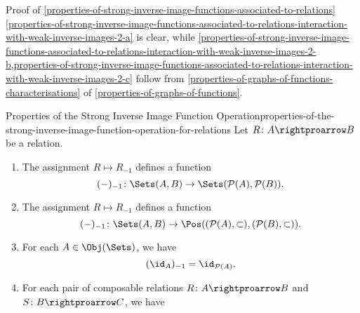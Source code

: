\begin{Proof}{Proof of \cref{properties-of-strong-inverse-image-functions-associated-to-relations}}
    \cref{properties-of-strong-inverse-image-functions-associated-to-relations-interaction-with-weak-inverse-images-2-a} is clear, while \cref{properties-of-strong-inverse-image-functions-associated-to-relations-interaction-with-weak-inverse-images-2-b,properties-of-strong-inverse-image-functions-associated-to-relations-interaction-with-weak-inverse-images-2-c} follow from \cref{properties-of-graphs-of-functions-characterisations} of \cref{properties-of-graphs-of-functions}.
\end{Proof}
\begin{proposition}{Properties of the Strong Inverse Image Function Operation}{properties-of-the-strong-inverse-image-function-operation-for-relations}%
    Let $R\colon A\rightproarrow B$ be a relation.
    \begin{enumerate}
        \item\label{properties-of-the-strong-inverse-image-function-operation-for-relations-functionality-1}The assignment $R\mapsto R_{-1}$ defines a function
            \[
                (-)_{-1}%
                \colon%
                \Sets(A,B)
                \to%
                \Sets(\mathcal{P}(A),\mathcal{P}(B)).
            \]%
        \item\label{properties-of-the-strong-inverse-image-function-operation-for-relations-functionality-2}The assignment $R\mapsto R_{-1}$ defines a function
            \[
                (-)_{-1}%
                \colon%
                \Sets(A,B)
                \to%
                \Pos((\mathcal{P}(A),\subset),(\mathcal{P}(B),\subset)).
            \]%
        \item\label{properties-of-the-strong-inverse-image-function-operation-for-relations-interaction-with-identities}For each $A\in\Obj(\Sets)$, we have
            \[
                (\id_{A})_{-1}%
                =%
                \id_{\mathcal{P}(A)}.%
            \]%
        \item\label{properties-of-the-strong-inverse-image-function-operation-for-relations-interaction-with-composition}For each pair of composable relations $R\colon A\rightproarrow B$ and $S\colon B\rightproarrow C$, we have%
            \begin{webcompile}

\end{webcompile}
\end{enumerate}
\end{proposition}
